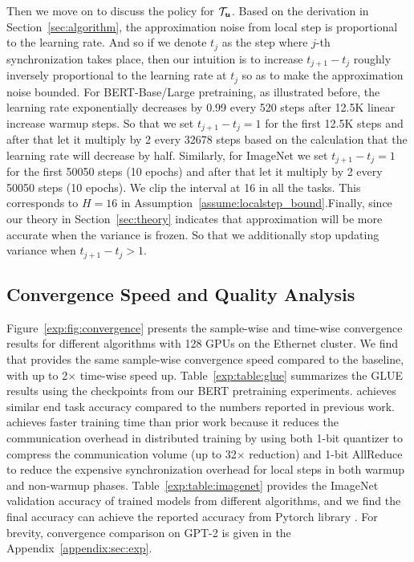 Then we move on to discuss the policy for $\mathcal{T}_{\boldsymbol{u}}$. Based on the derivation in Section~\ref{sec:algorithm}, the approximation noise from local step is proportional to the learning rate. And so if we denote $t_j$ as the step where $j$-th synchronization takes place, then our intuition is to increase $t_{j+1}-t_{j}$ roughly inversely proportional to the learning rate at $t_j$ so as to make the approximation noise bounded. 
For BERT-Base/Large pretraining, as illustrated before, the learning rate exponentially decreases by 0.99 every 520 steps after 12.5K linear increase warmup steps. So that we set $t_{j+1}-t_{j}=1$ for the first 12.5K steps and after that let it multiply by 2 every 32678 steps based on the calculation that the learning rate will decrease by half. Similarly, for ImageNet we set $t_{j+1}-t_{j}=1$ for the first 50050 steps (10 epochs) and after that let it multiply by 2 every 50050 steps (10 epochs).
We clip the interval at 16 in all the tasks. This corresponds to $H=16$ in Assumption~\ref{assume:localstep_bound}.Finally, since our theory in Section~\ref{sec:theory} indicates that approximation will be more accurate when the variance is frozen. So that we additionally stop updating variance when $t_{j+1}-t_{j} > 1$.

\subsection{Convergence Speed and Quality Analysis}
Figure~\ref{exp:fig:convergence} presents the sample-wise and time-wise convergence results for different algorithms with 128 GPUs on the Ethernet cluster. We find that {\myalgo} provides the same sample-wise convergence speed compared to the baseline, with up to 2$\times$ time-wise speed up. Table~\ref{exp:table:glue} summarizes the GLUE results using the checkpoints from our BERT pretraining experiments. {\myalgo} achieves similar end task accuracy compared to the numbers reported in previous work. \myalgo achieves faster training time than prior work because it reduces the communication overhead in distributed training by using both 1-bit quantizer to compress the communication volume (up to 32$\times$ reduction) and 1-bit AllReduce to reduce the expensive synchronization overhead for local steps in both warmup and non-warmup phases.  
Table~\ref{exp:table:imagenet} provides the ImageNet validation accuracy of trained models from different algorithms, and we find the final accuracy can achieve the reported accuracy from Pytorch library \citep{pytorchTorchvisionmodelsx2014}. For brevity, convergence comparison on GPT-2 is given in the Appendix~\ref{appendix:sec:exp}.

